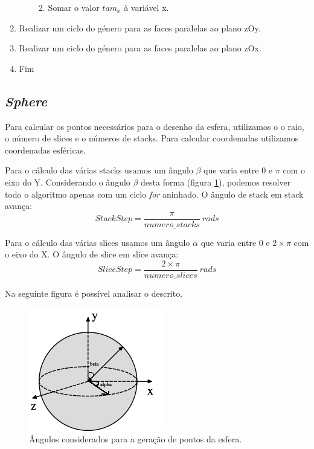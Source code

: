 \documentclass[a4paper]{article}
\begin{document}
\begin{enumerate}
\begin{enumerate}
\begin{enumerate}
      \vspace{0.5cm}

      \item Somar o valor $tam_{x}$ à variável x.

      \end{enumerate}

    \end{enumerate}

    \item Realizar um ciclo do género para as faces paralelas ao plano zOy.
    \item Realizar um ciclo do género para as faces paralelas ao plano zOx.

    \item Fim
\end{enumerate}
\rmfamily

\newpage

\subsection{\textit{Sphere}}
\label{sec:sphere}

Para calcular os pontos necessários para o desenho da esfera, utilizamos o o raio, o número de slices e o números de stacks. Para calcular coordenadas utilizamos coordenadas esféricas.

Para o cálculo das várias stacks usamos um ângulo $\beta$ que varia entre 0 e $\pi$ com o eixo do Y. Considerando o ângulo $\beta$ desta forma (figura \ref{img:sphere_angles}), podemos resolver todo o algoritmo apenas com um ciclo \emph{for} aninhado. O ângulo de stack em stack avança: $$StackStep = \frac{\pi}{numero\_stacks}\ rads$$

Para o cálculo das várias slices usamos um ângulo $\alpha$ que varia entre 0 e $2\times\pi$ com o eixo do X. O ângulo de slice em slice avança: $$ SliceStep = \frac{2\times\pi}{numero\_slices}\ rads$$

Na seguinte figura é possível analisar o descrito.

\begin{figure}[H]
\centering
\includegraphics[scale=1.2]{sphere_angles.png}
\caption{Ângulos considerados para a geração de pontos da esfera.}
\label{img:sphere_angles}
\end{figure}
\end{document}
